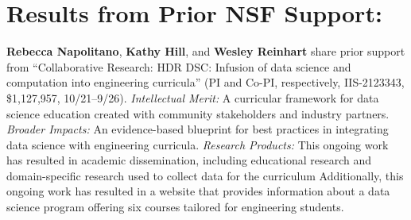 \documentclass[11pt]{article}
\begin{document}


\section{Results from Prior NSF Support:}

\textbf{Rebecca Napolitano}, \textbf{Kathy Hill}, and \textbf{Wesley Reinhart} share prior support from ``Collaborative Research: HDR DSC: Infusion of data science and computation into engineering curricula'' (PI and Co-PI, respectively, IIS-2123343, \$1,127,957, 10/21–9/26).
\textit{Intellectual Merit:} A curricular framework for data science education created with community stakeholders and industry partners. 
\textit{Broader Impacts:} An evidence-based blueprint for best practices in integrating data science with engineering curricula. 
\textit{Research Products:} This ongoing work has resulted in academic dissemination, including educational research \cite{asdetranslating2023, solnosky2024wip, reinhart2025opinion, napolitano2025analyzing} and domain-specific research used to collect data for the curriculum \cite{farnod2022damage, farnod2023displacement, farnod2025damage, upadhyay2025data, kumar2025bio, oturak2026data, paulino2021grammar, paulino2022reviver, paulino2023automating, saleem2023analysis,     whitesides2023research, kaushal2026historic,napolitano2026shm, duan2026preserving, napolitano2025preserving, maalouf2025assessment, paulino2025data, blain2025nheri, kallas2025understanding, kallas2025beyond, napolitano2025analyzing, maalouf2025community, kallas2025image, napolitano2025educational, reinhart2025opinion, farnod2025damage, saleem2025comparative, alam2024data, paulino2024determining, kaushal2024three, chen2024addressing, kaushal2024assessing, kallas2024understanding, saleem2024evaluating, kaushal2023understanding, laflamme2023roadmap, kallas2023image, kallas2023automated}
Additionally, this ongoing work has resulted in a website that provides information about a data science program offering six courses tailored for engineering students.
\end{document}
